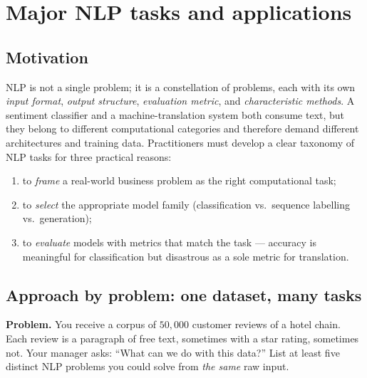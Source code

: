 \documentclass[12pt,a4paper]{report}
\theoremstyle{definition}
\theoremstyle{remark}
\begin{document}
\section{Major NLP tasks and applications}

\subsection{Motivation}
NLP is not a single problem; it is a constellation of problems, each with its own \emph{input format}, \emph{output structure}, \emph{evaluation metric}, and \emph{characteristic methods}. A sentiment classifier and a machine-translation system both consume text, but they belong to different computational categories and therefore demand different architectures and training data. Practitioners must develop a clear taxonomy of NLP tasks for three practical reasons:
\begin{enumerate}
    \item to \emph{frame} a real-world business problem as the right computational task;
    \item to \emph{select} the appropriate model family (classification vs.\ sequence labelling vs.\ generation);
    \item to \emph{evaluate} models with metrics that match the task --- accuracy is meaningful for classification but disastrous as a sole metric for translation.
\end{enumerate}

\subsection{Approach by problem: one dataset, many tasks}
\textbf{Problem.} You receive a corpus of $50{,}000$ customer reviews of a hotel chain. Each review is a paragraph of free text, sometimes with a star rating, sometimes not. Your manager asks: ``What can we do with this data?'' List at least five distinct NLP problems you could solve from \emph{the same} raw input.
\end{document}
